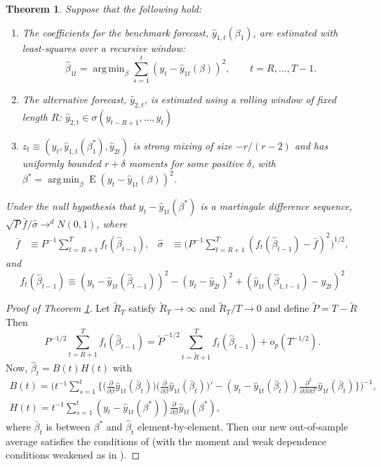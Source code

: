 \documentclass[12pt]{article}
\newtheorem{thm}{Theorem}
\DeclareMathOperator*{\argmin}{arg\,min}
\DeclareMathOperator{\E}{E}
\newcommand{\dd}[1]{\frac{\partial}{\partial #1}}
\begin{document}
\begin{thm}\label{thm:1}
  Suppose that the following hold:
  \begin{enumerate}
  \item The coefficients for the benchmark forecast,
    $\hat{y}_{1,t}(\beta_1)$, are estimated with least-squares over a
    recursive window:
    \[\hat{\beta}_{1t} = \argmin_{\beta} \sum_{s=1}^{t} (y_t -
    \hat{y}_{1t}(\beta))^2, \qquad t = R,\dots,T-1.\]
  \item The alternative forecast, $\hat{y}_{2,t}$, is estimated using
    a rolling window of fixed length $R$: $\hat{y}_{2,t} \in
    \sigma(y_{t-R+1},\dots,y_t)$
  \item $z_t \equiv (y_t, \hat{y}_{1,t}(\beta_1^{*}), \hat{y}_{2t})$
    is strong mixing of size $-r/(r-2)$ and has uniformly bounded
    $r+\delta$ moments for some positive $\delta$, with $\beta^{*} =
    \argmin_{\beta} \E (y_t - \hat{y}_{1t}(\beta))^2$.

  \end{enumerate}
  Under the null hypothesis that $y_t - \hat{y}_{1t}(\beta^{*})$ is a
  martingale difference sequence, $\sqrt{P} \bar f / \hat{\sigma}
  \to^d N(0,1)$, where
  \begin{align*}
  \bar f
  &\equiv P^{-1} \sum_{t=R+1}^T f_t(\hat{\beta}_{t-1}),&  \hat{\sigma} &\equiv \Big(P^{-1}
  \sum_{t=R+1}^T (f_t(\hat{\beta}_{t-1}) - \bar f)^2\Big)^{1/2},
  \end{align*}
 and    
  \begin{equation*}
    f_t(\hat{\beta}_{t-1}) \equiv (y_t - \hat{y}_{1t}(\hat{\beta}_{t-1}))^2
    - (y_t - \hat{y}_{2t})^2 +
    (\hat{y}_{1t}(\hat{\beta}_{1,t-1}) - \hat{y}_{2t})^2
  \end{equation*}
\end{thm}

\begin{proof}[Proof of Theorem \ref{thm:1}] Let $\tilde{R}_T$ satisfy $\tilde{R}_T \to \infty$ and
  $\tilde{R}_T/T \to 0$ and define $\tilde{P} = T - \tilde{R}$ Then
  \begin{equation*}
    P^{-1/2}\sum_{t=R+1}^T f_t(\hat{\beta}_{t-1}) = \tilde{P}^{-1/2}
    \sum_{t=\tilde{R}+1}^T f_t(\hat{\beta}_{t-1}) + o_p(T^{-1/2}).
  \end{equation*}
  Now, $\hat{\beta}_t = B(t) H(t)$ with
  \begin{gather*}
    B(t) = \Big(t^{-1} \sum_{s=1}^t \Big\{\Big(\dd{\beta} \hat{y}_{1t}(\bar{\beta}_t)\Big)
    \Big(\dd{\beta} \hat{y}_{1t}(\bar{\beta}_t)\Big)' - (y_t -
    \hat{y}_{1t}(\bar{\beta}_t))\frac{\partial^2}{\partial\beta \partial\beta'}
    \hat{y}_{1t}(\bar{\beta}_t)\Big\}\Big)^{-1}, \\
    H(t) = t^{-1} \sum_{s=1}^t (y_t - \hat{y}_{1t}(\beta^{*}))
    \dd{\beta} \hat{y}_{1t}(\beta^{*}),
  \end{gather*}
  where $\bar{\beta}_t$ is between $\beta^{*}$ and $\hat{\beta}_t$
  element-by-element.  Then our new out-of-sample average satisfies
  the conditions of \citet[Theorem 4.1]{Wes:96} (with the moment and
  weak dependence conditions weakened as in \citet[Theorem
  2.3.1]{Mcc:00}).
\end{proof}




\end{document}
